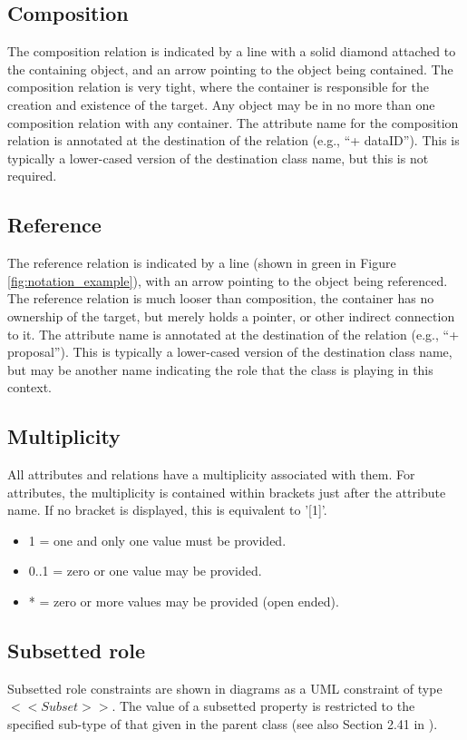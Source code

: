   \subsection{Composition}
  \label{sect:Composition}
  The composition relation is indicated by a line with a solid diamond attached to the
containing object, and an arrow pointing to the object being contained. The composition relation is
very tight, where the container is responsible for the creation and existence of the target. Any
object may be in no more than one composition relation with any container. The attribute name
for the composition relation is annotated at the destination of the relation (e.g., ``+ dataID''). This is
typically a lower-cased version of the destination class name, but this is not required.

  \subsection{Reference}
  \label{sect:Reference}
  The reference relation is indicated by a line (shown in green in Figure \ref{fig:notation_example}), with an arrow pointing to the object being
referenced. The reference relation is much looser than composition, the container has no
ownership of the target, but merely holds a pointer, or other indirect connection to it. The
attribute name is annotated at the destination of the relation (e.g., ``+ proposal''). This is typically
a lower-cased version of the destination class name, but may be another name indicating the role
that the class is playing in this context.

  \subsection{Multiplicity}
  \label{sect:Multiplicity}
  All attributes and relations have a multiplicity associated with them. For attributes, the multiplicity
is contained within brackets just after the attribute name. If no bracket is displayed, this is
equivalent to '[1]'.
\begin{itemize}
\item 1 = one and only one value must be provided.
\item 0..1 = zero or one value may be provided.
\item * = zero or more values may be provided (open ended).
\end{itemize}

  \subsection{Subsetted role}
  \label{sect:Subset}
Subsetted role constraints are shown in diagrams as a UML constraint of type $<<Subset>>$. The value of a subsetted property is restricted to the specified sub-type of that given in the parent class (see also Section 2.41 in \citet{2018ivoa.spec.0910L}).
